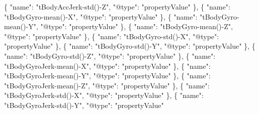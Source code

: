 \documentclass[
]{article}
\newenvironment{Shaded}{\begin{snugshade}}{\end{snugshade}}
\newcommand{\DataTypeTok}[1]{\textcolor[rgb]{0.13,0.29,0.53}{#1}}
\newcommand{\FunctionTok}[1]{\textcolor[rgb]{0.00,0.00,0.00}{#1}}
\newcommand{\OtherTok}[1]{\textcolor[rgb]{0.56,0.35,0.01}{#1}}
\newcommand{\StringTok}[1]{\textcolor[rgb]{0.31,0.60,0.02}{#1}}
\begin{document}
\begin{Shaded}
\begin{Highlighting}[]
    \FunctionTok{\{}
      \DataTypeTok{"name"}\FunctionTok{:} \StringTok{"tBodyAccJerk{-}std(){-}Z"}\FunctionTok{,}
      \DataTypeTok{"@type"}\FunctionTok{:} \StringTok{"propertyValue"}
    \FunctionTok{\}}\OtherTok{,}
    \FunctionTok{\{}
      \DataTypeTok{"name"}\FunctionTok{:} \StringTok{"tBodyGyro{-}mean(){-}X"}\FunctionTok{,}
      \DataTypeTok{"@type"}\FunctionTok{:} \StringTok{"propertyValue"}
    \FunctionTok{\}}\OtherTok{,}
    \FunctionTok{\{}
      \DataTypeTok{"name"}\FunctionTok{:} \StringTok{"tBodyGyro{-}mean(){-}Y"}\FunctionTok{,}
      \DataTypeTok{"@type"}\FunctionTok{:} \StringTok{"propertyValue"}
    \FunctionTok{\}}\OtherTok{,}
    \FunctionTok{\{}
      \DataTypeTok{"name"}\FunctionTok{:} \StringTok{"tBodyGyro{-}mean(){-}Z"}\FunctionTok{,}
      \DataTypeTok{"@type"}\FunctionTok{:} \StringTok{"propertyValue"}
    \FunctionTok{\}}\OtherTok{,}
    \FunctionTok{\{}
      \DataTypeTok{"name"}\FunctionTok{:} \StringTok{"tBodyGyro{-}std(){-}X"}\FunctionTok{,}
      \DataTypeTok{"@type"}\FunctionTok{:} \StringTok{"propertyValue"}
    \FunctionTok{\}}\OtherTok{,}
    \FunctionTok{\{}
      \DataTypeTok{"name"}\FunctionTok{:} \StringTok{"tBodyGyro{-}std(){-}Y"}\FunctionTok{,}
      \DataTypeTok{"@type"}\FunctionTok{:} \StringTok{"propertyValue"}
    \FunctionTok{\}}\OtherTok{,}
    \FunctionTok{\{}
      \DataTypeTok{"name"}\FunctionTok{:} \StringTok{"tBodyGyro{-}std(){-}Z"}\FunctionTok{,}
      \DataTypeTok{"@type"}\FunctionTok{:} \StringTok{"propertyValue"}
    \FunctionTok{\}}\OtherTok{,}
    \FunctionTok{\{}
      \DataTypeTok{"name"}\FunctionTok{:} \StringTok{"tBodyGyroJerk{-}mean(){-}X"}\FunctionTok{,}
      \DataTypeTok{"@type"}\FunctionTok{:} \StringTok{"propertyValue"}
    \FunctionTok{\}}\OtherTok{,}
    \FunctionTok{\{}
      \DataTypeTok{"name"}\FunctionTok{:} \StringTok{"tBodyGyroJerk{-}mean(){-}Y"}\FunctionTok{,}
      \DataTypeTok{"@type"}\FunctionTok{:} \StringTok{"propertyValue"}
    \FunctionTok{\}}\OtherTok{,}
    \FunctionTok{\{}
      \DataTypeTok{"name"}\FunctionTok{:} \StringTok{"tBodyGyroJerk{-}mean(){-}Z"}\FunctionTok{,}
      \DataTypeTok{"@type"}\FunctionTok{:} \StringTok{"propertyValue"}
    \FunctionTok{\}}\OtherTok{,}
    \FunctionTok{\{}
      \DataTypeTok{"name"}\FunctionTok{:} \StringTok{"tBodyGyroJerk{-}std(){-}X"}\FunctionTok{,}
      \DataTypeTok{"@type"}\FunctionTok{:} \StringTok{"propertyValue"}
    \FunctionTok{\}}\OtherTok{,}
    \FunctionTok{\{}
      \DataTypeTok{"name"}\FunctionTok{:} \StringTok{"tBodyGyroJerk{-}std(){-}Y"}\FunctionTok{,}
      \DataTypeTok{"@type"}\FunctionTok{:} \StringTok{"propertyValue"}

\end{Highlighting}
\end{Shaded}
\end{document}
